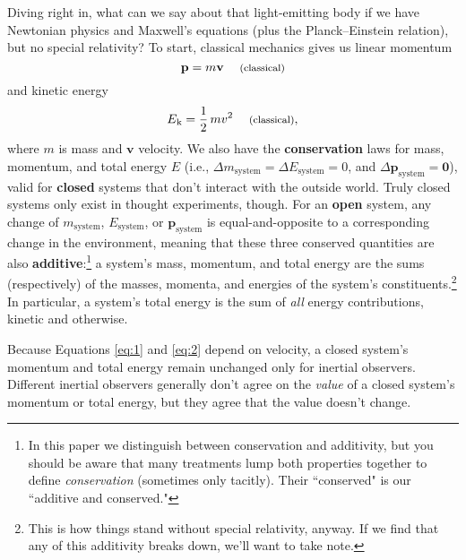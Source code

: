 \documentclass[12pt]{article}
\newcommand{\abs}[1]{\mathnormal \vv{#1}}
\renewcommand{\vv}[1]{\mathbf{#1}}
\begin{document}
Diving right in, what can we say about that light-emitting body if we have Newtonian physics and Maxwell's equations (plus the Planck--Einstein relation), but no special relativity? To start, classical mechanics gives us linear momentum
\begin{equation}\label{eq:1}
\vv p=m\vv v \quad \text{\footnotesize{ (classical)}}
\end{equation}
and kinetic energy
\begin{equation}\label{eq:2}
E_{\mkern.5mu \textrm{k}}= \frac{1}{2} \, m \abs v ^2 \quad \text{\footnotesize{ (classical)}},
\end{equation}
where $m$ is mass and $\vv{v}$ velocity. We also have the \textbf{conservation} laws for mass, momentum, and total energy $E$ (i.e., $\Delta m_{\mathrm{system}} = \Delta E_{\mathrm{system}} = 0$, and $\Delta \vv p_{\mathrm{system}} = \vv 0$), valid for \textbf{closed} systems that don't interact with the outside world. Truly closed systems only exist in thought experiments, though. For an \textbf{open} system, any change of $m_{\mathrm{system}}$, $E_{\mathrm{system}}$, or $\vv p_{\mathrm{system}}$ is equal-and-opposite to a corresponding change in the environment, meaning that these three conserved quantities are also \textbf{additive}:\footnote{In this paper we distinguish between conservation and additivity, but you should be aware that many treatments lump both properties together to define \emph{conservation} (sometimes only tacitly). Their ``conserved" is our ``additive and conserved."} a system's mass, momentum, and total energy are the sums (respectively) of the masses, momenta, and energies of the system's constituents.\footnote{\label{fn:ad}This is how things stand without special relativity, anyway. If we find that any of this additivity breaks down, we'll want to take note.} In particular, a system's total energy is the sum of \emph{all} energy contributions, kinetic and otherwise.

Because Equations \ref{eq:1} and \ref{eq:2} depend on velocity, a closed system's momentum and total energy remain unchanged only for inertial observers. Different inertial observers generally don't agree on the \emph{value} of a closed system's momentum or total energy, but they agree that the value doesn't change.
\end{document}
